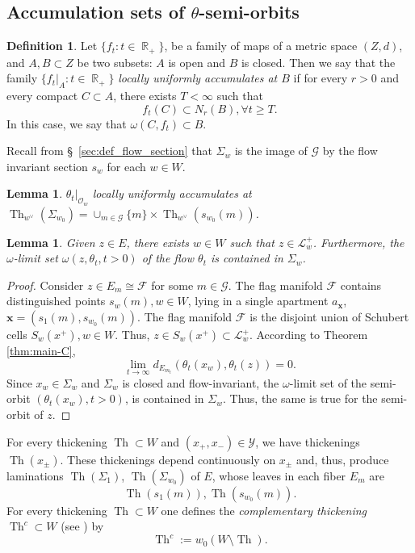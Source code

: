 \documentclass[12pt]{amsbook}%
\newtheorem{lem}[thm]{Lemma}
\theoremstyle{definition}
\newtheorem{defi}[thm]{Definition}
\theoremstyle{remark}
\numberwithin{section}{chapter}
\numberwithin{subsection}{section}
\numberwithin{figure}{chapter}
\DeclareMathOperator{\Th}{Th}
\DeclareMathOperator{\R}{\mathbb{R}}
\def\cF{{\mathscr{F}}}
\def\cO{{\mathscr{O}}}
\def\cY{{\mathscr{Y}}}
\def\bx{\mathbf{x}}
\def\cG{{\mathscr{G}}}
\def\cL{{\mathscr{L}}}
\begin{document}
{{\subsection{ Accumulation sets of $\theta$-semi-orbits}




\begin{defi}
Let $\{f_t: t\in \R_+\}$, 
be a family of maps of a metric space $(Z,d)$, and $A, B\subset Z$ be two subsets: $A$ is open and $B$ is closed. Then we say that the  
family $\{ f_t|_A: t\in \R_+\}$  {\em locally uniformly accumulates at $B$} if for every $r>0$ and every compact $C\subset A$, there exists $T<\infty$ such that 
$$
f_t(C)\subset N_r(B), \forall t\geqslant T. 
$$
In this case, we say that $\omega(C, f_t)\subset B$. 
\end{defi}

Recall from \S~\ref{sec:def_flow_section} that $\Sigma_w$ is the image of $\cG$ by the flow invariant section $s_w$ for each $w \in W$. 
\begin{lem}
$\theta_t|_{\cO_w}$ locally uniformly accumulates at $\Th_{w^\vee}(\Sigma_{w_0}) = \cup_{m \in \cG} \{ m\} \times \Th_{w^\vee}(s_{w_0}(m))$.  
\end{lem}

\begin{lem}
Given $z\in E$, there exists $w\in W$ such that $z\in \cL^+_w$. Furthermore, the $\omega$-limit set $\omega(z, \theta_t, t> 0)$ 
of  the flow $\theta_t$  is contained in $\Sigma_w$.  
\end{lem}
\begin{proof} Consider $z\in E_m\cong \cF$ for some $m\in \cG$. The flag manifold $\cF$ contains distinguished points $s_w(m), w\in W$, lying in a single apartment $a_{\bx}$, $\bx=(s_1(m), s_{w_0}(m))$. The flag manifold $\cF$ is the disjoint union of Schubert cells $S_w(x^+), w\in W$.  
Thus, $z\in S_w(x^+)\subset \cL^+_w$.  According to Theorem \ref{thm:main-C}, 
$$
\lim_{t\to\infty} d_{E_{m_t}}(\theta_t(x_w), \theta_t(z))=0. 
$$
Since $x_w\in \Sigma_w$ and $\Sigma_w$ is closed and flow-invariant, the $\omega$-limit set of the semi-orbit $(\theta_t(x_w), t >0)$, is contained in $\Sigma_w$. Thus, the same is true for the semi-orbit of $z$.  \end{proof} 


For every thickening $\Th\subset W$ and $(x_+, x_-)\in \cY$, we have thickenings $\Th(x_\pm)$. These thickenings depend continuously on $x_\pm$ and, thus, produce laminations $\Th(\Sigma_{1})$, $\Th(\Sigma_{w_0})$ of $E$, whose leaves in each fiber $E_m$ are 
$$
\Th(s_1(m)), \Th(s_{w_0}(m)). 
$$
For every thickening $\Th\subset W$ one defines the {\em complementary thickening} $\Th^c\subset W$ (see \cite{KLP18A}) by 
\begin{equation}\label{eq:complementary} 
\Th^c:= w_0 (W\setminus \Th). 
\end{equation}

}}
\end{document}

